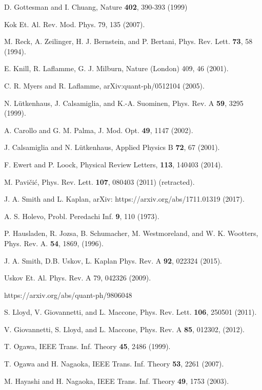 \documentclass[aps,pra,twocolumn,showpacs,superscriptaddress,floatfix,10pt]{revtex4}
\begin{document}
\begin{thebibliography}{99}
	
 D. Gottesman and I. Chuang, Nature {\bf 402}, 390-393 (1999)

 Kok Et. Al.
Rev. Mod. Phys. 79, 135 (2007).

 M. Reck, A. Zeilinger, H. J. Bernstein, and P. Bertani, Phys. Rev. Lett. {\bf 73}, 58 (1994).

  E. Knill, R. Laflamme, G. J. Milburn, Nature (London) 409, 46 (2001).

 C. R. Myers and R. Laflamme, arXiv:quant-ph/0512104 (2005).

 N. L\"utkenhaus, J. Calsamiglia, and K.-A. Suominen, Phys. Rev. A {\bf 59}, 3295 (1999).

 A. Carollo and G. M. Palma, J. Mod. Opt. {\bf 49}, 1147 (2002).

 J. Calsamiglia and N. L\"utkenhaus, Applied Physics B {\bf 72}, 67 (2001).

 F. Ewert and P. Loock, Physical Review Letters, {\bf 113}, 140403 (2014).

 M. Pavi\v{c}i\'c, Phys. Rev. Lett. {\bf 107}, 080403 (2011) (retracted).

 J. A. Smith and L. Kaplan, arXiv: https://arxiv.org/abs/1711.01319 (2017).

 A. S. Holevo, Probl. Peredachi Inf. \textbf{9}, 110 (1973).	

 P. Hausladen, R. Jozsa, B. Schumacher, M. Westmoreland, and W. K. Wootters, Phys. Rev. A. \textbf{54}, 1869, (1996).

 J. A. Smith, D.B. Uskov, L. Kaplan Phys. Rev. A \textbf{92}, 022324 (2015).

 Uskov Et. Al.
Phys. Rev. A 79, 042326 (2009).

 https://arxiv.org/abs/quant-ph/9806048

 S. Lloyd, V. Giovannetti, and L. Maccone, Phys. Rev. Lett. \textbf{106}, 250501 (2011).

 V. Giovannetti, S. Lloyd, and L. Maccone, Phys. Rev. A \textbf{85}, 012302, (2012).

 T. Ogawa, IEEE Trans. Inf. Theory \textbf{45}, 2486 (1999).

 T. Ogawa and H. Nagaoka, IEEE Trans. Inf. Theory \textbf{53}, 2261 (2007).

 M. Hayashi and H. Nagaoka, IEEE Trans. Inf. Theory \textbf{49}, 1753 (2003).

\end{thebibliography}
\end{document}
